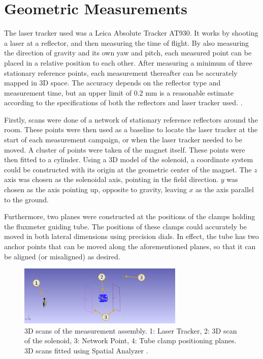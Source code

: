 \section{Geometric Measurements}
The laser tracker used was a Leica Absolute Tracker AT930.
It works by shooting a laser at a reflector, and then
measuring the time of flight. By also measuring the direction of gravity
and its own yaw and pitch, each measured point can be placed in a relative
position to each other. After measuring a minimum of three stationary
reference points, each measurement thereafter can be accurately mapped
in 3D space.
The accuracy depends on the reflector
type and measurement time, but an upper limit of
0.2 mm is a reasonable estimate according to the
specifications of both the reflectors and laser tracker
used. \cite{noauthor_leica_2015}.

Firstly, scans were done of a network of stationary reference reflectors
around the room. These points were then used as a baseline to locate the
laser tracker at the start of each measurement campaign, or when
the laser tracker needed to be moved. A cluster of points were
taken of the magnet itself. These points
were then fitted to a cylinder. Using a 3D model of the
solenoid, a coordinate system could be constructed
with its origin at the geometric center of the magnet.
The $z$ axis was chosen as the solenoidal axis, pointing
in the field direction. $y$ was chosen as the axis
pointing up, opposite to gravity, leaving $x$ as 
the axis parallel to the ground.

Furthermore, two planes were constructed at the positions
of the clamps holding the fluxmeter guiding tube. The
positions of these clamps could accurately be moved in
both lateral dimensions using precision dials. In effect,
the tube has two anchor points that can be moved along
the aforementioned planes, so that it can be aligned (or misaligned)
as desired.

\begin{figure}[!h]
    \centering
    \includegraphics[width=0.7\textwidth]{figs/3Dscan}
    \caption{3D scans of the measurement assembly.
        1: Laser Tracker, 2: 3D scan of the solenoid,
        3: Network Point, 4: Tube clamp positioning planes.
        3D scans fitted using Spatial Analyzer \cite{hexagon_spatial_nodate}.}
    \label{fig:3dscan}
\end{figure}

